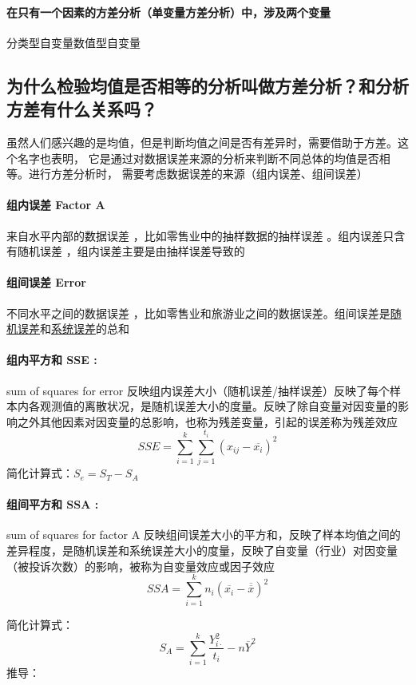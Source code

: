 \documentclass[UTF8,10pt]{book}
\begin{document}
\paragraph{在只有一个因素的方差分析（单变量方差分析）中，涉及两个变量}	分类型自变量数值型自变量

\subsection{为什么检验均值是否相等的分析叫做方差分析？和分析方差有什么关系吗？}
    虽然人们感兴趣的是均值，但是判断均值之间是否有差异时，需要借助于方差。这个名字也表明，
    它是通过对数据误差来源的分析来判断不同总体的均值是否相等。进行方差分析时，
    需要考虑数据误差的来源（组内误差、组间误差）

    \paragraph{组内误差 Factor A}	来自水平内部的数据误差 ，比如零售业中的抽样数据的抽样误差 。组内误差只含有随机误差 ，组内误差主要是由抽样误差导致的

    \paragraph{组间误差 Error}	不同水平之间的数据误差 ，比如零售业和旅游业之间的数据误差。组间误差是\underline{随机误差}和\underline{系统误差}的总和

    \paragraph{组内平方和 SSE :} sum of squares for error	反映组内误差大小（随机误差/抽样误差）反映了每个样本内各观测值的离散状况，是随机误差大小的度量。反映了除自变量对因变量的影响之外其他因素对因变量的总影响，也称为残差变量，引起的误差称为残差效应$$ SSE = \sum_{i=1}^k \sum_{j=1}^{t_i} (x_{ij}-\overline{x_i})^2 $$ 简化计算式：$ S_e = S_T - S_A $

    \paragraph{组间平方和 SSA :} sum of squares for factor A	反映组间误差大小的平方和，反映了样本均值之间的差异程度，是随机误差和系统误差大小的度量，反映了自变量（行业）对因变量（被投诉次数）的影响，被称为自变量效应或因子效应$$ SSA = \sum_{i=1}^k n_i \left(\overline{x_i} - \overline{\overline{x}} \right)^2 $$ 
    
    简化计算式：
    $$ S_A = \sum_{i=1}^k \frac{Y_{i \cdot}^2}{t_i} -n\overline{Y}^2 $$ 
    推导： 
    
\end{document}
